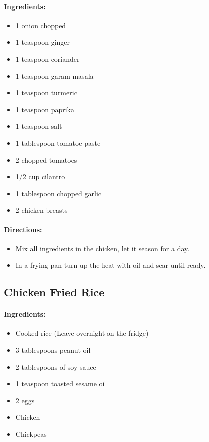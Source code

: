 \documentclass{article}
\begin{document}
\paragraph{Ingredients:}
\begin{itemize}
    \item 1 onion chopped
    \item 1 teaspoon ginger
    \item 1 teaspoon coriander
    \item 1 teaspoon garam masala
    \item 1 teaspoon turmeric
    \item 1 teaspoon paprika
    \item 1 teaspoon salt
    \item 1 tablespoon tomatoe paste
    \item 2 chopped tomatoes
    \item 1/2 cup cilantro
    \item 1 tablespoon chopped garlic
    \item 2 chicken breasts
\end{itemize}

\paragraph{Directions:}
\begin{itemize}
    \item Mix all ingredients in the chicken, let it season for a day.
    \item In a frying pan turn up the heat with oil and sear until ready.
\end{itemize}

\subsection{Chicken Fried Rice}

\paragraph{Ingredients:}
\begin{itemize}
    \item Cooked rice (Leave overnight on the fridge)
    \item 3 tablespoons peanut oil
    \item 2 tablespoons of soy sauce
    \item 1 teaspoon toasted sesame oil
    \item 2 eggs
    \item Chicken
    \item Chickpeas
\end{itemize}
\end{document}
